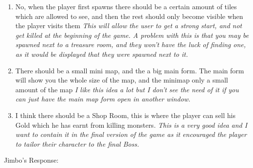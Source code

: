 \documentclass[14pt]{article}
\begin{document}
\begin{enumerate}
	\item{No, when the player first spawns there should be a certain amount of tiles which are allowed to see, and then the rest should only become visible when the player visits them}
	\em{This will allow the user to get a strong start, and not get killed at the beginning of the game. A problem with this is that you may be spawned next to a treasure room, and they won't have the luck of finding one, as it would be displayed that they were spawned next to it.}
	
	\item{There should be a small mini map, and the a big main form. The main form will show you the whole size of the map, and the minimap only a small amount of the map}
	\em{I like this idea a lot but I don't see the need of it if you can just have the main map form open in another window.}
	
	\item{I think there should be a Shop Room, this is where the player can sell his Gold which he has earnt from killing monsters.}
	\em{This is a very good idea and I want to contain it in the final version of the game as it encouraged the player to tailor their character to the final Boss.}
\end{enumerate}





\centerline{Jimbo's Response:}
\end{document}
